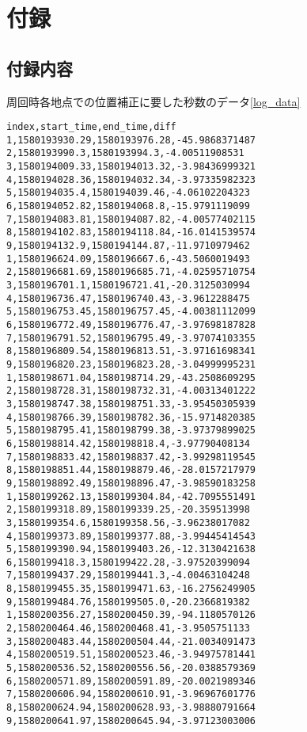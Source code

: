 \appendix
\chapter{付録}

\section{付録内容}
周回時各地点での位置補正に要した秒数のデータ\ref{log_data}
\begin{lstlisting}[caption=log\_data.csv,label=log_data]
index,start_time,end_time,diff
1,1580193930.29,1580193976.28,-45.9868371487
2,1580193990.3,1580193994.3,-4.00511908531
3,1580194009.33,1580194013.32,-3.98436999321
4,1580194028.36,1580194032.34,-3.97335982323
5,1580194035.4,1580194039.46,-4.06102204323
6,1580194052.82,1580194068.8,-15.9791119099
7,1580194083.81,1580194087.82,-4.00577402115
8,1580194102.83,1580194118.84,-16.0141539574
9,1580194132.9,1580194144.87,-11.9710979462
1,1580196624.09,1580196667.6,-43.5060019493
2,1580196681.69,1580196685.71,-4.02595710754
3,1580196701.1,1580196721.41,-20.3125030994
4,1580196736.47,1580196740.43,-3.9612288475
5,1580196753.45,1580196757.45,-4.00381112099
6,1580196772.49,1580196776.47,-3.97698187828
7,1580196791.52,1580196795.49,-3.97074103355
8,1580196809.54,1580196813.51,-3.97161698341
9,1580196820.23,1580196823.28,-3.04999995231
1,1580198671.04,1580198714.29,-43.2508609295
2,1580198728.31,1580198732.31,-4.00313401222
3,1580198747.38,1580198751.33,-3.95450305939
4,1580198766.39,1580198782.36,-15.9714820385
5,1580198795.41,1580198799.38,-3.97379899025
6,1580198814.42,1580198818.4,-3.97790408134
7,1580198833.42,1580198837.42,-3.99298119545
8,1580198851.44,1580198879.46,-28.0157217979
9,1580198892.49,1580198896.47,-3.98590183258
1,1580199262.13,1580199304.84,-42.7095551491
2,1580199318.89,1580199339.25,-20.359513998
3,1580199354.6,1580199358.56,-3.96238017082
4,1580199373.89,1580199377.88,-3.99445414543
5,1580199390.94,1580199403.26,-12.3130421638
6,1580199418.3,1580199422.28,-3.97520399094
7,1580199437.29,1580199441.3,-4.00463104248
8,1580199455.35,1580199471.63,-16.2756249905
9,1580199484.76,1580199505.0,-20.2366819382
1,1580200356.27,1580200450.39,-94.1180570126
2,1580200464.46,1580200468.41,-3.9505751133
3,1580200483.44,1580200504.44,-21.0034091473
4,1580200519.51,1580200523.46,-3.94975781441
5,1580200536.52,1580200556.56,-20.0388579369
6,1580200571.89,1580200591.89,-20.0021989346
7,1580200606.94,1580200610.91,-3.96967601776
8,1580200624.94,1580200628.93,-3.98880791664
9,1580200641.97,1580200645.94,-3.97123003006

\end{lstlisting}
